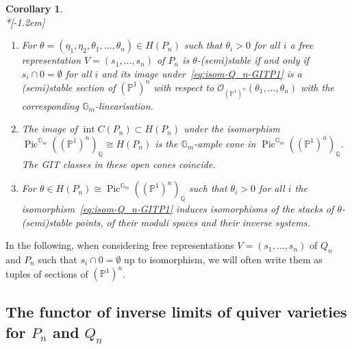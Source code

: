 \documentclass[10pt,a4paper]{amsart}
\newtheorem{coro}[theo]{Corollary}
\theoremstyle{definition}
\def\Q{\mathds Q}
\def\G{\mathds G}
\def\P{\mathds P}
\def\O{\mathcal O}
\DeclareMathOperator{\interior}{int}
\DeclareMathOperator{\Pic}{Pic}
\begin{document}
\begin{coro}\label{cor:reprPn-P1n-GIT}\ \\*[-1.2em]

\begin{enumerate}[label=(\alph*)]
\item\label{coro2.12_a} 
For $\theta=(\eta_1,\eta_2,\theta_1,\ldots,\theta_n)\in H(P_n)$ such that 
$\theta_i>0$ for all $i$ a free representation $V=(s_1,\ldots,s_n)$ of $P_n$ is 
$\theta$-(semi)stable if and only if $s_i\cap 0=\emptyset$ for all $i$ and its 
image under~\eqref{eq:isom-Q_n-GITP1} is a (semi)stable section of $(\P^1)^n$
with respect to $\O_{(\P^1)^n}(\theta_1,\ldots,\theta_n)$ with the corresponding 
$\G_m$-linearisation. %

\item\label{coro2.12_b} 
The image of $\interior C(P_n)\subset H(P_n)$ under the isomorphism 
$\Pic^{\G_m}((\P^1)^n)_\Q\cong H(P_n)$ is the $\G_m$-ample cone in 
$\Pic^{\G_m}((\P^1)^n)_\Q$. The GIT classes in these open cones coincide.%

\item\label{coro2.12_c} 
For $\theta\in H(P_n)\cong\Pic^{\G_m}((\P^1)^n)_\Q$ such that 
$\theta_i>0$ for all $i$ the isomorphism~\eqref{eq:isom-Q_n-GITP1} induces 
isomorphisms of the stacks of $\theta$-(semi)stable points, of their moduli spaces 
and their inverse systems.
\end{enumerate}
\end{coro}

In the following, when considering free representations $V=(s_1,\ldots,s_n)$
of $Q_n$ and $P_n$ such that $s_i\cap 0=\emptyset$ up to isomorphism,
we will often write them as tuples of sections of $(\P^1)^n$.



\subsection{The functor of inverse limits of quiver varieties for \texorpdfstring{$P_n$}{Pn} and \texorpdfstring{$Q_n$}{QN}}
\label{subsec:functor-limPnQn}
\end{document}
